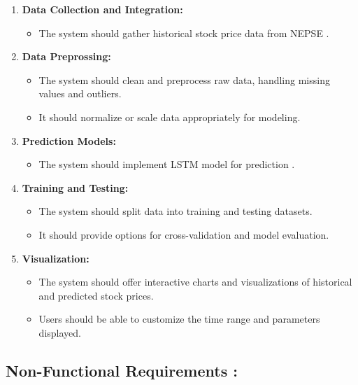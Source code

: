 \documentclass[./main.tex]{subfiles}
\begin{document}
\begin{enumerate}[label=\roman*.]
  \item \textbf{Data Collection and Integration:}
    \begin{itemize}
      \item The system should gather historical stock price data from NEPSE .
    \end{itemize}
  
  \item \textbf{Data Preprossing:}
    \begin{itemize}
      \item The system should clean and preprocess raw data, handling missing values and outliers.
      \item It should normalize or scale data appropriately for modeling.
    \end{itemize}
    
  \item \textbf{Prediction Models:}
    \begin{itemize}
      \item The system should implement LSTM model for prediction .
    \end{itemize}
  
  \item \textbf{Training and Testing:}
    \begin{itemize}
      \item The system should split data into training and testing datasets.
      \item It should provide options for cross-validation and model evaluation.
    \end{itemize}
  \item \textbf{Visualization:}
    \begin{itemize}
      \item The system should offer interactive charts and visualizations of historical and predicted stock prices.
      \item Users should be able to customize the time range and parameters displayed.
    \end{itemize}
\end{enumerate}
\subsection{Non-Functional Requirements : }
\end{document}
